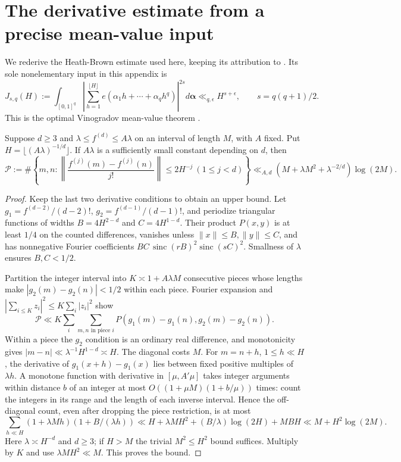 \section{The derivative estimate from a precise mean-value input}\label{app:hbderivative}

We rederive the Heath-Brown estimate used here, keeping its attribution
to \cite{HB17}. Its sole nonelementary input in this appendix is
\begin{equation}\label{eq:vmvtinput}
 J_{s,q}(H):=\int_{[0,1]^q}\left|\sum_{h=1}^{\lfloor H\rfloor}
 e(\alpha_1h+\cdots+\alpha_qh^q)\right|^{2s}d\boldsymbol\alpha
 \ll_{q,\epsilon}H^{s+\epsilon},\qquad s=q(q+1)/2.
\end{equation}
This is the optimal Vinogradov mean-value theorem \cite{BDG16,Woo16}.

\begin{lemma}\label{lem:hbcluster}
Suppose $d\ge3$ and $\lambda\le f^{(d)}\le A\lambda$ on an interval
of length $M$, with $A$ fixed. Put $H=\lfloor(A\lambda)^{-1/d}\rfloor$.
If $A\lambda$ is a sufficiently small constant depending on $d$, then
\[
 \mathcal P:=\#\left\{m,n:\left\|\frac{f^{(j)}(m)-f^{(j)}(n)}{j!}\right\|
 \le2H^{-j}\ (1\le j<d)\right\}
 \ll_{A,d}(M+\lambda M^2+\lambda^{-2/d})\log(2M).
\]
\end{lemma}
\begin{proof}
Keep the last two derivative conditions to obtain an upper bound. Let
$g_1=f^{(d-2)}/(d-2)!$, $g_2=f^{(d-1)}/(d-1)!$, and periodize
triangular functions of widths $B=4H^{2-d}$ and $C=4H^{1-d}$.
Their product $P(x,y)$ is at least $1/4$ on the counted differences,
vanishes unless $\|x\|\le B,\|y\|\le C$, and has nonnegative Fourier
coefficients $BC\,\operatorname{sinc}(rB)^2\operatorname{sinc}(sC)^2$.
Smallness of $\lambda$ ensures $B,C<1/2$.

Partition the integer interval into $K\asymp1+A\lambda M$ consecutive
pieces whose lengths make $|g_2(m)-g_2(n)|<1/2$ within each piece.
Fourier expansion and $|\sum_{i\le K}z_i|^2\le K\sum_i|z_i|^2$ show
\[
 \mathcal P\ll K\sum_i\sum_{m,n\text{ in piece }i}
 P(g_1(m)-g_1(n),g_2(m)-g_2(n)).
\]
Within a piece the $g_2$ condition is an ordinary real difference,
and monotonicity gives $|m-n|\ll\lambda^{-1}H^{1-d}\asymp H$.
The diagonal costs $M$. For $m=n+h$, $1\le h\ll H$, the derivative
of $g_1(x+h)-g_1(x)$ lies between fixed positive multiples of
$\lambda h$. A monotone function with derivative in $[\mu,A'\mu]$
takes integer arguments within distance $b$ of an integer at most
$O((1+\mu M)(1+b/\mu))$ times: count the integers in its range and
the length of each inverse interval. Hence the off-diagonal
count, even after dropping the piece restriction, is at most
\[
 \sum_{h\ll H}(1+\lambda Mh)(1+B/(\lambda h))
 \ll H+\lambda MH^2+(B/\lambda)\log(2H)+MBH
 \ll M+H^2\log(2M).
\]
Here $\lambda\asymp H^{-d}$ and $d\ge3$; if $H>M$ the trivial
$M^2\le H^2$ bound suffices. Multiply by $K$ and use
$\lambda M H^2\ll M$. This proves the bound.
\end{proof}


